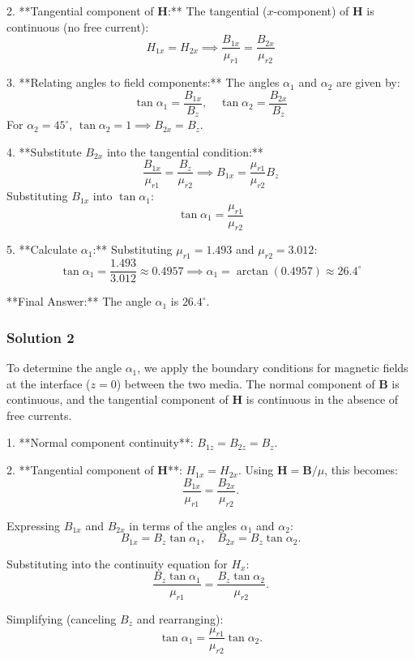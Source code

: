\documentclass{article}
\begin{document}
2. **Tangential component of \(\mathbf{H}\):**  
   The tangential (\(x\)-component) of \(\mathbf{H}\) is continuous (no free current):  
   \[
   H_{1x} = H_{2x} \implies \frac{B_{1x}}{\mu_{r1}} = \frac{B_{2x}}{\mu_{r2}}
   \]

3. **Relating angles to field components:**  
   The angles \(\alpha_1\) and \(\alpha_2\) are given by:  
   \[
   \tan\alpha_1 = \frac{B_{1x}}{B_z}, \quad \tan\alpha_2 = \frac{B_{2x}}{B_z}
   \]  
   For \(\alpha_2 = 45^\circ\), \(\tan\alpha_2 = 1 \implies B_{2x} = B_z\).

4. **Substitute \(B_{2x}\) into the tangential condition:**  
   \[
   \frac{B_{1x}}{\mu_{r1}} = \frac{B_z}{\mu_{r2}} \implies B_{1x} = \frac{\mu_{r1}}{\mu_{r2}} B_z
   \]  
   Substituting \(B_{1x}\) into \(\tan\alpha_1\):  
   \[
   \tan\alpha_1 = \frac{\mu_{r1}}{\mu_{r2}}
   \]

5. **Calculate \(\alpha_1\):**  
   Substituting \(\mu_{r1} = 1.493\) and \(\mu_{r2} = 3.012\):  
   \[
   \tan\alpha_1 = \frac{1.493}{3.012} \approx 0.4957 \implies \alpha_1 = \arctan(0.4957) \approx 26.4^\circ
   \]

**Final Answer:**  
The angle \(\alpha_1\) is \(\boxed{26.4^\circ}\).

\subsubsection{Solution 2}
To determine the angle \(\alpha_1\), we apply the boundary conditions for magnetic fields at the interface (\(z = 0\)) between the two media. The normal component of \(\mathbf{B}\) is continuous, and the tangential component of \(\mathbf{H}\) is continuous in the absence of free currents.

1. **Normal component continuity**:  
   \(B_{1z} = B_{2z} = B_z\).

2. **Tangential component of \(\mathbf{H}\)**:  
   \(H_{1x} = H_{2x}\). Using \(\mathbf{H} = \mathbf{B}/\mu\), this becomes:
   \[
   \frac{B_{1x}}{\mu_{r1}} = \frac{B_{2x}}{\mu_{r2}}.
   \]

Expressing \(B_{1x}\) and \(B_{2x}\) in terms of the angles \(\alpha_1\) and \(\alpha_2\):
\[
B_{1x} = B_z \tan\alpha_1, \quad B_{2x} = B_z \tan\alpha_2.
\]

Substituting into the continuity equation for \(H_x\):
\[
\frac{B_z \tan\alpha_1}{\mu_{r1}} = \frac{B_z \tan\alpha_2}{\mu_{r2}}.
\]

Simplifying (canceling \(B_z\) and rearranging):
\[
\tan\alpha_1 = \frac{\mu_{r1}}{\mu_{r2}} \tan\alpha_2.
\]
\end{document}
